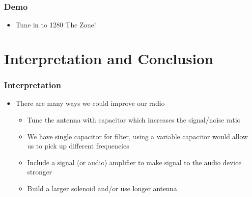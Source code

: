 \documentclass[11pt]{beamer}
\theoremstyle{definition}
\begin{document}
         \begin{frame}
              \frametitle{Demo}
              \begin{itemize}
                  \item Tune in to 1280 The Zone!
              \end{itemize}
         \end{frame}

         \section{Interpretation and Conclusion}
         \begin{frame}
              \frametitle{Interpretation}
               \begin{itemize}
                     \item There are many ways we could improve our radio
                     \vspace{2mm}
                     \begin{itemize}[<+->]
                          \item Tune the antenna with capacitor which increases the signal/noise ratio
                          \vspace{1mm}
                          \item We have single capacitor for filter, using a variable capacitor would allow us to pick up different frequencies
                          \vspace{1mm}
                          \item Include a signal (or audio) amplifier to make signal to the audio device stronger
                          \vspace{1mm}
                          \item Build a larger solenoid and/or use longer antenna
                     \end{itemize}
               \end{itemize}
         \end{frame}
\end{document}
